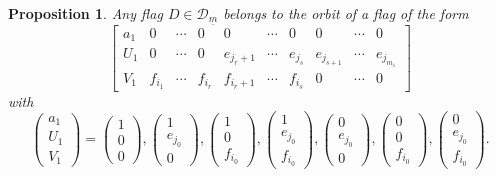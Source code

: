 \documentclass[pdftex]{sigma}
\numberwithin{equation}{section}
\newtheorem{Proposition}[Theorem]{Proposition}
\theoremstyle{definition}
\newcommand{\D}{\mathcal{D}}
\theoremstyle{plain}
\theoremstyle{plain}
\theoremstyle{plain}
\theoremstyle{plain}
\begin{document}
\begin{Proposition}{\label{orbits I}}
	Any flag $D \in \D_{\underline m}$ belongs to the orbit of a flag of the form
	\begin{equation*}
		\begin{bmatrix}
		a_1 & 0 & \cdots & 0 & 0 & \cdots & 0 & 0 & \cdots & 0\\
		U_1 & 0 & \cdots & 0  & e_{j_{r}+1} & \cdots & e_{j_{s}} & e_{j_{s+1}} & \cdots & e_{j_{m_1}} \\
		V_1 & f_{i_1} & \cdots & f_{i_{r}}  & f_{i_{r}+1} & \cdots & f_{i_s} & 0 & \cdots & 0
	\end{bmatrix}
	\end{equation*}
	with
	\begin{equation*}
		\begin{pmatrix}
		a_1 \\
		U_1 \\
		V_1
	\end{pmatrix} = \begin{pmatrix}
	1 \\
	0 \\
	0
	\end{pmatrix}, \begin{pmatrix}
	1 \\
	e_{j_0} \\
	0
	\end{pmatrix}, \begin{pmatrix}
	1 \\
	0 \\
	f_{i_0}
	\end{pmatrix}, \begin{pmatrix}
	1 \\
	e_{j_0} \\
	f_{i_0}
	\end{pmatrix}, \begin{pmatrix}
	0 \\
	e_{j_0} \\
	0
	\end{pmatrix}, \begin{pmatrix}
	0 \\
	0 \\
	f_{i_0}
	\end{pmatrix}, \begin{pmatrix}
	0 \\
	e_{j_0} \\
	f_{i_0}
	\end{pmatrix}.
	\end{equation*}
\end{Proposition}
\end{document}
